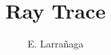 \documentclass{book}
\begin{document}
\title{Ray Trace}
\author{E. Larra\~{n}aga}

\maketitle




\end{document}
